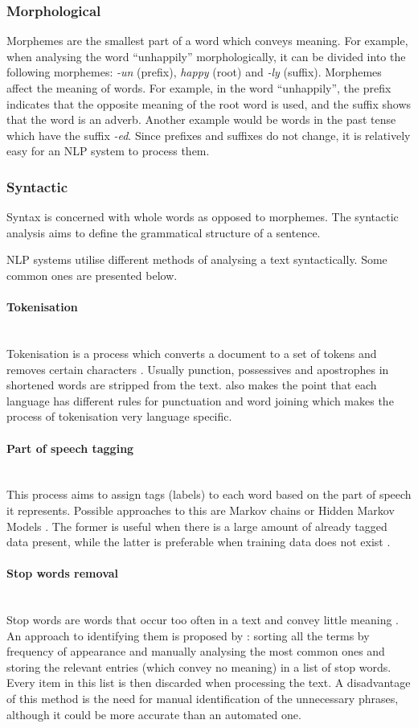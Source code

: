 \documentclass[12pt,a4paper]{article}
\newcommand{\myparagraph}[1]{\paragraph{#1}\mbox{}\\}
\begin{document}
\subsubsection{Morphological}
Morphemes are the smallest part of a word which conveys meaning. For example, when analysing the word “unhappily” morphologically, it can be divided into the following morphemes: \textit{-un} (prefix), \textit{happy} (root) and \textit{-ly} (suffix). Morphemes affect the meaning of words. For example, in the word “unhappily”, the prefix indicates that the opposite meaning of the root word is used, and the suffix shows that the word is an adverb. Another example would be words in the past tense which have the suffix \textit{-ed}. Since prefixes and suffixes do not change, it is relatively easy for an NLP system to process them.

\subsubsection{Syntactic}
Syntax is concerned with whole words as opposed to morphemes. The syntactic analysis aims to define the grammatical structure of a sentence.

NLP systems utilise different methods of analysing a text syntactically. Some common ones are presented below.

\myparagraph{Tokenisation}
Tokenisation is a process which converts a document to a set of tokens and removes certain characters \citep{Manning2008}. Usually punction, possessives and apostrophes in shortened words are stripped from the text. \citet{Manning2008} also makes the point that each language has different rules for punctuation and word joining which makes the process of tokenisation very language specific.

\myparagraph{Part of speech tagging}
This process aims to assign tags (labels) to each word based on the part of speech it represents. Possible approaches to this are Markov chains or Hidden Markov Models \citep{Martinez2010}. The former is useful when there is a large amount of already tagged data present, while the latter is preferable when training data does not exist \citep{Martinez2010}.

\myparagraph{Stop words removal}
Stop words are words that occur too often in a text and convey little meaning \citep{Martinez2010}. An approach to identifying them is proposed by \citet{Manning2008}: sorting all the terms by frequency of appearance and manually analysing the most common ones and storing the relevant entries (which convey no meaning) in a list of stop words. Every item in this list is then discarded when processing the text. A disadvantage of this method is the need for manual identification of the unnecessary phrases, although it could be more accurate than an automated one.
\end{document}
